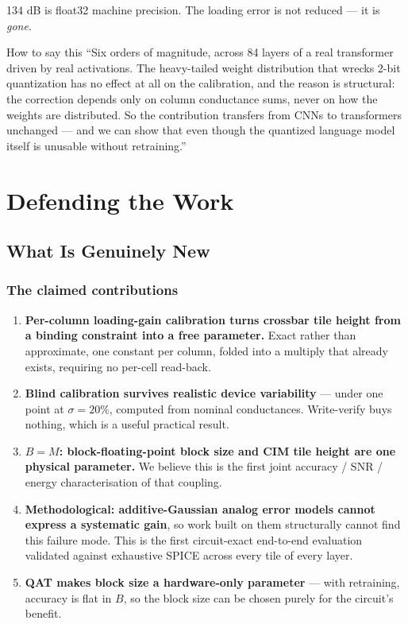 \documentclass[11pt,a4paper]{report}
\begin{document}
134 dB is float32 machine precision. The loading error is not reduced --- it
is \emph{gone}.

\begin{saybox}{How to say this}
``Six orders of magnitude, across 84 layers of a real transformer driven by
real activations. The heavy-tailed weight distribution that wrecks 2-bit
quantization has no effect at all on the calibration, and the reason is
structural: the correction depends only on column conductance sums, never on
how the weights are distributed. So the contribution transfers from CNNs to
transformers unchanged --- and we can show that even though the quantized
language model itself is unusable without retraining.''
\end{saybox}

\part{Defending the Work}
\chapter{What Is Genuinely New}

\section{The claimed contributions}

\begin{enumerate}[leftmargin=1.6em]
  \item \textbf{Per-column loading-gain calibration turns crossbar tile height
        from a binding constraint into a free parameter.} Exact rather than
        approximate, one constant per column, folded into a multiply that
        already exists, requiring no per-cell read-back.
  \item \textbf{Blind calibration survives realistic device variability} ---
        under one point at $\sigma = 20\%$, computed from nominal
        conductances. Write-verify buys nothing, which is a useful practical
        result.
  \item \textbf{$B = M$: block-floating-point block size and CIM tile height
        are one physical parameter.} We believe this is the first joint
        accuracy / SNR / energy characterisation of that coupling.
  \item \textbf{Methodological: additive-Gaussian analog error models cannot
        express a systematic gain}, so work built on them structurally cannot
        find this failure mode. This is the first circuit-exact end-to-end
        evaluation validated against exhaustive SPICE across every tile of
        every layer.
  \item \textbf{QAT makes block size a hardware-only parameter} --- with
        retraining, accuracy is flat in $B$, so the block size can be chosen
        purely for the circuit's benefit.
\end{enumerate}
\end{document}
